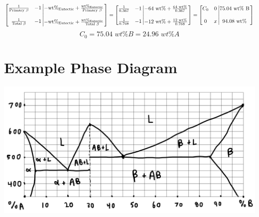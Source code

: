 \documentclass{article}
\begin{document}
$$
\left[\begin{matrix}
\frac{1}{\textnormal{Primary } \beta} & -1\\\\
\frac{1}{\textnormal{Total } \beta} & -1
\end{matrix}
\left|\begin{matrix}
-\textnormal{wt\%}_\textnormal{Eutectic}+\frac{\textnormal{wt\%}_\textnormal{Eutectic}}{\textnormal{Primary   }\beta}\\\\
-\textnormal{wt\%}_\textnormal{Eutectic}+\frac{\textnormal{wt\%}_\textnormal{Eutectic}}{\textnormal{Total   }\beta}
\end{matrix}
\right.
\right]=
\left[\begin{matrix}
\frac{1}{0.367} & -1\\\\
\frac{1}{0.768} & -1
\end{matrix}
\left|\begin{matrix}
-64\textnormal{ wt\%}+\frac{64 \textnormal{ wt\%}}{0.367}\\\\
-12\textnormal{ wt\%}+\frac{12 \textnormal{ wt\%}}{0.768}
\end{matrix}
\right.
\right]=
\left[\begin{matrix}
C_0 & 0\\\\
0 & x
\end{matrix}
\left|\begin{matrix}
75.04 \textnormal{ wt\% B}\\\\
94.08 \textnormal{ wt\%}
\end{matrix}
\right.
\right]
$$
\[C_0=\mathit{75.04 \textit{ wt\% B}}=\textit{24.96 wt\% A}\]
\section*{Example Phase Diagram}
\begin{center}
\includegraphics[scale=0.33]{Question 7.png}
\end{center}
\end{document}
